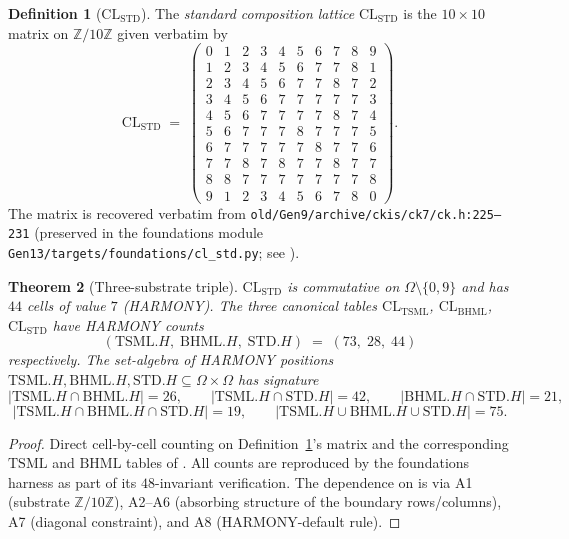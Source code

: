 \documentclass[11pt,reqno]{amsart}
\theoremstyle{plain}
\newtheorem{theorem}{Theorem}[section]
\theoremstyle{definition}
\newtheorem{definition}[theorem]{Definition}
\theoremstyle{remark}
\newcommand{\Z}{\mathbb{Z}}
\newcommand{\TSML}{\mathrm{TSML}}
\newcommand{\BHML}{\mathrm{BHML}}
\newcommand{\STD}{\mathrm{STD}}
\begin{document}
\begin{definition}[$\mathrm{CL}_\STD$]\label{def:std}
The \emph{standard composition lattice} $\mathrm{CL}_\STD$ is the
$10\times 10$ matrix on $\Z/10\Z$ given verbatim by
\[
\mathrm{CL}_\STD \;=\;
\begin{pmatrix}
0 & 1 & 2 & 3 & 4 & 5 & 6 & 7 & 8 & 9 \\
1 & 2 & 3 & 4 & 5 & 6 & 7 & 7 & 8 & 1 \\
2 & 3 & 4 & 5 & 6 & 7 & 7 & 8 & 7 & 2 \\
3 & 4 & 5 & 6 & 7 & 7 & 7 & 7 & 7 & 3 \\
4 & 5 & 6 & 7 & 7 & 7 & 7 & 8 & 7 & 4 \\
5 & 6 & 7 & 7 & 7 & 8 & 7 & 7 & 7 & 5 \\
6 & 7 & 7 & 7 & 7 & 7 & 8 & 7 & 7 & 6 \\
7 & 7 & 8 & 7 & 8 & 7 & 7 & 8 & 7 & 7 \\
8 & 8 & 7 & 7 & 7 & 7 & 7 & 7 & 7 & 8 \\
9 & 1 & 2 & 3 & 4 & 5 & 6 & 7 & 8 & 0
\end{pmatrix}.
\]
The matrix is recovered verbatim from
\texttt{old/Gen9/archive/ckis/ck7/ck.h:225--231} (preserved in the
foundations module \texttt{Gen13/targets/foundations/cl\_std.py}; see
\cite{FoundationsModule}).
\end{definition}

\begin{theorem}[Three-substrate triple]\label{thm:triple}
$\mathrm{CL}_\STD$ is commutative on $\Omega \setminus \{0,9\}$
and has $44$ cells of value $7$ (HARMONY). The three canonical
tables $\mathrm{CL}_\TSML$, $\mathrm{CL}_\BHML$, $\mathrm{CL}_\STD$
have HARMONY counts
\[
(\TSML.H,\;\BHML.H,\;\STD.H) \;=\; (73,\;28,\;44)
\]
respectively. The set-algebra of HARMONY positions
$\TSML.H,\BHML.H,\STD.H \subseteq \Omega\times\Omega$ has signature
\[
\bigl|\TSML.H \cap \BHML.H\bigr| = 26,\qquad
\bigl|\TSML.H \cap \STD.H\bigr| = 42,\qquad
\bigl|\BHML.H \cap \STD.H\bigr| = 21,
\]
\[
\bigl|\TSML.H \cap \BHML.H \cap \STD.H\bigr| = 19,\qquad
\bigl|\TSML.H \cup \BHML.H \cup \STD.H\bigr| = 75.
\]
\end{theorem}

\begin{proof}
Direct cell-by-cell counting on
Definition~\ref{def:std}'s matrix and the corresponding $\TSML$ and
$\BHML$ tables of \cite{SandersForcing}. All counts are reproduced by
the foundations harness \cite{FoundationsModule} as part of its
$48$-invariant verification. The dependence on
\cite{SandersForcing} is via A1 (substrate $\Z/10\Z$), A2--A6
(absorbing structure of the boundary rows/columns), A7 (diagonal
constraint), and A8 (HARMONY-default rule).
\end{proof}
\end{document}

